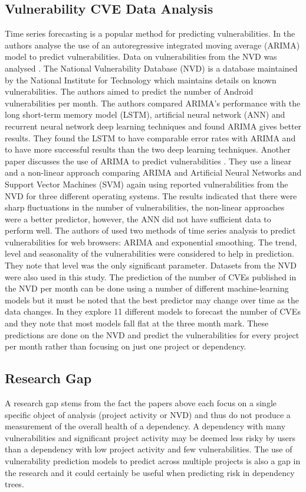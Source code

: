 \documentclass[conference]{IEEEtran}
\begin{document}
\subsection{Vulnerability CVE Data Analysis}
Time series forecasting is a popular method for predicting vulnerabilities. In \cite{gencer_time_2021} the authors analyse the use of an autoregressive integrated moving average (ARIMA) model to predict vulnerabilities. Data on vulnerabilities from the NVD was analysed \cite{noauthor_vulnerability_nodate}. The National Vulnerability Database (NVD) is a database maintained by the National Institute for Technology which maintains details on known vulnerabilities. The authors aimed to predict the number of Android vulnerabilities per month. The authors compared ARIMA's performance with the long short-term memory model (LSTM), artificial neural network (ANN) and recurrent neural network deep learning techniques and found ARIMA gives better results. They found the LSTM to have comparable error rates with ARIMA and to have more successful results than the two deep learning techniques. Another paper discusses the use of ARIMA to predict vulnerabilities \cite{pokhrel_cybersecurity_2017}. They use a linear and a non-linear approach comparing ARIMA and Artificial Neural Networks and Support Vector Machines (SVM) again using reported vulnerabilities from the NVD for three different operating systems. The results indicated that there were sharp fluctuations in the number of vulnerabilities, the non-linear approaches were a better predictor, however, the ANN did not have sufficient data to perform well. The authors of \cite{roumani_time_2015} used two methods of time series analysis to predict vulnerabilities for web browsers: ARIMA and exponential smoothing. The trend, level and seasonality of the vulnerabilities were considered to help in prediction. They note that level was the only significant parameter. Datasets from the NVD were also used in this study. The prediction of the number of CVEs published in the NVD per month can be done using a number of different machine-learning models but it must be noted that the best predictor may change over time as the data changes. In \cite{leverett_vulnerability_2021} they explore 11 different models to forecast the number of CVEs and they note that most models fall flat at the three month mark. These predictions are done on the NVD and predict the vulnerabilities for every project per month rather than focusing on just one project or dependency. 

\subsection{Research Gap}
A research gap stems from the fact the papers above each focus on a single specific object of analysis (project activity or NVD) and thus do not produce a measurement of the overall health of a dependency. A dependency with many vulnerabilities and significant project activity may be deemed less risky by users than a dependency with low project activity and few vulnerabilities. The use of vulnerability prediction models to predict across multiple projects is also a gap in the research and it could certainly be useful when predicting risk in dependency trees. 
\end{document}
